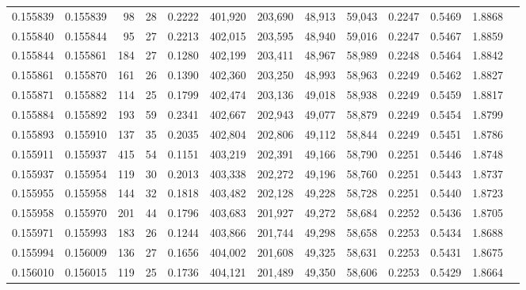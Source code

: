 \begin{tabular}{rrrrrrrrrrrrr}
0.155839 & 0.155839 &    98 &  28 &                                     0.2222 & 401,920 & 203,690 &  48,913 &  59,043 & 0.2247 & 0.5469 & 1.8868 \\
0.155840 & 0.155844 &    95 &  27 &                                     0.2213 & 402,015 & 203,595 &  48,940 &  59,016 & 0.2247 & 0.5467 & 1.8859 \\
0.155844 & 0.155861 &   184 &  27 &                                     0.1280 & 402,199 & 203,411 &  48,967 &  58,989 & 0.2248 & 0.5464 & 1.8842 \\
0.155861 & 0.155870 &   161 &  26 &                                     0.1390 & 402,360 & 203,250 &  48,993 &  58,963 & 0.2249 & 0.5462 & 1.8827 \\
0.155871 & 0.155882 &   114 &  25 &                                     0.1799 & 402,474 & 203,136 &  49,018 &  58,938 & 0.2249 & 0.5459 & 1.8817 \\
0.155884 & 0.155892 &   193 &  59 &                                     0.2341 & 402,667 & 202,943 &  49,077 &  58,879 & 0.2249 & 0.5454 & 1.8799 \\
0.155893 & 0.155910 &   137 &  35 &                                     0.2035 & 402,804 & 202,806 &  49,112 &  58,844 & 0.2249 & 0.5451 & 1.8786 \\
0.155911 & 0.155937 &   415 &  54 &                                     0.1151 & 403,219 & 202,391 &  49,166 &  58,790 & 0.2251 & 0.5446 & 1.8748 \\
0.155937 & 0.155954 &   119 &  30 &                                     0.2013 & 403,338 & 202,272 &  49,196 &  58,760 & 0.2251 & 0.5443 & 1.8737 \\
0.155955 & 0.155958 &   144 &  32 &                                     0.1818 & 403,482 & 202,128 &  49,228 &  58,728 & 0.2251 & 0.5440 & 1.8723 \\
0.155958 & 0.155970 &   201 &  44 &                                     0.1796 & 403,683 & 201,927 &  49,272 &  58,684 & 0.2252 & 0.5436 & 1.8705 \\
0.155971 & 0.155993 &   183 &  26 &                                     0.1244 & 403,866 & 201,744 &  49,298 &  58,658 & 0.2253 & 0.5434 & 1.8688 \\
0.155994 & 0.156009 &   136 &  27 &                                     0.1656 & 404,002 & 201,608 &  49,325 &  58,631 & 0.2253 & 0.5431 & 1.8675 \\
0.156010 & 0.156015 &   119 &  25 &                                     0.1736 & 404,121 & 201,489 &  49,350 &  58,606 & 0.2253 & 0.5429 & 1.8664 \\

\end{tabular}
